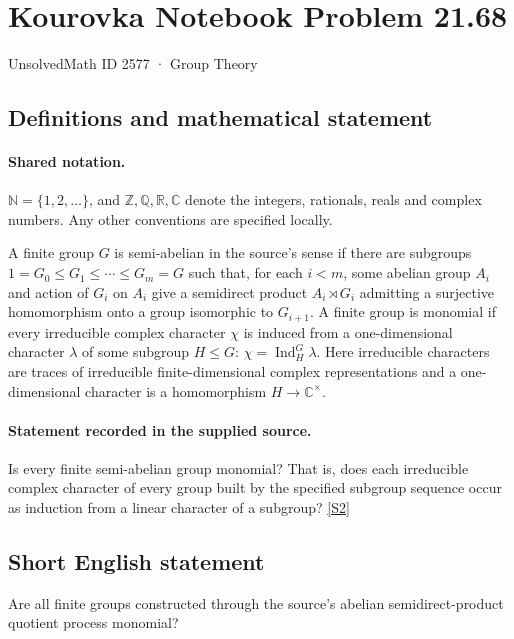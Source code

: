 \documentclass[11pt]{article}
\newcommand{\sref}[2]{\hyperlink{source:#1:#2}{[S#2]}}
\begin{document}
\setcounter{section}{2576}
\section{Kourovka Notebook Problem 21.68}\label{2577}
{\small\sffamily UnsolvedMath ID 2577 · Group Theory}
\subsection{Definitions and mathematical statement}

\paragraph{Shared notation.}$\mathbb N=\{1,2,\ldots\}$, and $\mathbb Z,\mathbb Q,\mathbb R,\mathbb C$ denote the integers, rationals, reals and complex numbers. Any other conventions are specified locally.


A finite group $G$ is semi-abelian in the source's sense if there are subgroups
$1=G_0\leq G_1\leq\cdots\leq G_m=G$ such that, for each $i<m$, some abelian group $A_i$ and action of $G_i$ on $A_i$ give a semidirect product $A_i\rtimes G_i$ admitting a surjective homomorphism onto a group isomorphic to $G_{i+1}$. A finite group is monomial if every irreducible complex character $\chi$ is induced from a one-dimensional character $\lambda$ of some subgroup $H\leq G$: $\chi=\operatorname{Ind}_H^G\lambda$. Here irreducible characters are traces of irreducible finite-dimensional complex representations and a one-dimensional character is a homomorphism $H\to\mathbb C^\times$.
\paragraph{Statement recorded in the supplied source.}
Is every finite semi-abelian group monomial? That is, does each irreducible complex character of every group built by the specified subgroup sequence occur as induction from a linear character of a subgroup? \sref{2577}{2}
\subsection{Short English statement}
Are all finite groups constructed through the source’s abelian semidirect-product quotient process monomial?
\end{document}
